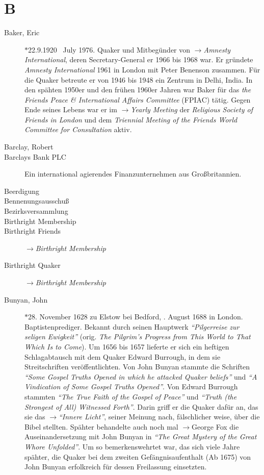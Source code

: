\section*{B}

\articlesize

\begin{description}

 \item[Baker, Eric] $\ast$22.9.1920 \dag~July 1976. Quaker und Mitbegünder von $\to$\textit{Amnesty International}, deren Secretary-General er 1966 bis 1968 war. Er gründete \textit{Amnesty International} 1961 in London mit Peter Benenson zusammen. Für die Quaker betreute er von 1946 bis 1948 ein Zentrum in Delhi, India. In den spähten 1950er und den frühen 1960er Jahren war Baker für das \textit{the Friends Peace \& International Affairs Committee} (FPIAC) tätig. Gegen Ende seines Lebens war er im $\to$\textit{Yearly Meeting} der \textit{Religious Society of Friends in London} und dem \textit{Triennial Meeting of the Friends World Committee for Consultation} aktiv.

 \item[Barclay, Robert]

 \item[Barclays Bank PLC] Ein international agierendes Finanzunternehmen aus Großbritannien.

 \item[Beerdigung]

 \item[Bennenungsausschuß]
 
 \item[Bezirksversammlung]
 \item[Birthright Membership]
 \item[Birthright Friends] $\to$\textit{Birthright Membership}
 \item[Birthright Quaker] $\to$\textit{Birthright Membership}

 \item[Bunyan, John] $\ast$28. November 1628 zu Elstow bei Bedford, . August 1688 in London. Baptistenprediger. Bekannt durch seinen Hauptwerk \textit{"`Pilgerreise zur seligen Ewigkeit"'} (orig. \textit{The Pilgrim’s Progress from This World to That Which Is to Come}). Um 1656 bis 1657 lieferte er sich ein heftigen Schlagabtausch mit dem Quaker Edward Burrough, in dem sie Streitschriften veröffentlichten. Von John Bunyan stammte die Schriften \textit{"`Some Gospel Truths Opened in which he attacked Quaker beliefs"'} und \textit{"`A Vindication of Some Gospel Truths Opened"'}. Von Edward Burrough stammten \textit{"`The True Faith of the Gospel of Peace"'} und \textit{"`Truth (the Strongest of All) Witnessed Forth"'}. Darin griff er die Quaker dafür an, das sie das $\to$\textit{"`Innere Licht"'}, seiner Meinung nach, fälschlicher weise, über die Bibel stellten. Spähter behandelte auch noch mal $\to$George Fox die Auseinandersetzung mit John Bunyan in \textit{"`The Great Mystery of the Great Whore Unfolded"'}. Um so bemerkenswehrtet war, das sich viele Jahre spähter, die Quaker bei dem zweiten Gefängnisaufenthalt (Ab 1675) von John Bunyan erfolkreich für dessen Freilassung einsetzten.


\end{description}
